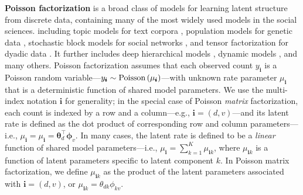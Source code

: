 \documentclass[letterpaper]{article}
\newcommand{\subs}{\pmb{i}}
\newcommand{\ys}{y_{\subs}}
\newcommand{\mus}{\mu_{\subs}}
\newcommand{\musk}{\mu_{\subs k}}
\newcommand{\Pois}[1]{\textup{Poisson}\left( #1 \right)}
\newcommand{\teq}{\!=\!}
\begin{document}
  \textbf{Poisson factorization}
  \citep{titsias2008infinite,cemgil2009bayesian,zhou2012augment,gopalan2013efficient,paisley2014bayesian}
  is a broad class of models for learning latent structure from discrete data,
  containing many of the most widely used models in the social sciences.
  including topic models for text corpora
  \citep{blei2003latent,buntine2004applying,canny2004gap}, population models
  for genetic data \citep{pritchard2000inference}, stochastic block models for
  social networks
  \citep{ball2011efficient,gopalan2013efficient,zhou2015infinite}, and tensor
  factorization for dyadic data
  \citep{welling2001positive,chi2012tensors,schmidt2013nonparametric,schein2015bayesian,schein2016bayesian}.
  It further includes deep hierarchical models
  \citep{ranganath2015deep,zhou2015poisson}, dynamic models
  \citep{charlin2015dynamic,acharya2015nonparametric,schein2016pgds}, and many
  others.
  Poisson factorization assumes that each observed count $\ys$ is a Poisson
  random variable---$\ys \sim \Pois{\mus}$---with unknown rate parameter $\mus$
  that is a deterministic function of shared model parameters. We use the
  multi-index notation $\subs$ for generality; in the special case of Poisson
  \emph{matrix} factorization, each count is indexed by a row and a
  column---e.g., $\subs \!=\! (d, v)$---and its latent rate is defined as the
  dot product of corresponding row and column parameters---i.e., $\mus \teq
  \mu_{\subs} \teq \boldsymbol{\theta}_d^{\top} \boldsymbol{\phi}_v$. In many
  cases, the latent rate is defined to be a \emph{linear} function of shared
  model parameters---i.e., $\mus = \sum_{k=1}^K \musk$, where $\musk$ is a
  function of latent parameters specific to latent component $k$. In Poisson
  matrix factorization, we define $\musk$ as the product of the latent
  parameters associated with $\subs = (d, v)$, or $\musk =
  \theta_{dk}\phi_{kv}$.
  
\end{document}
